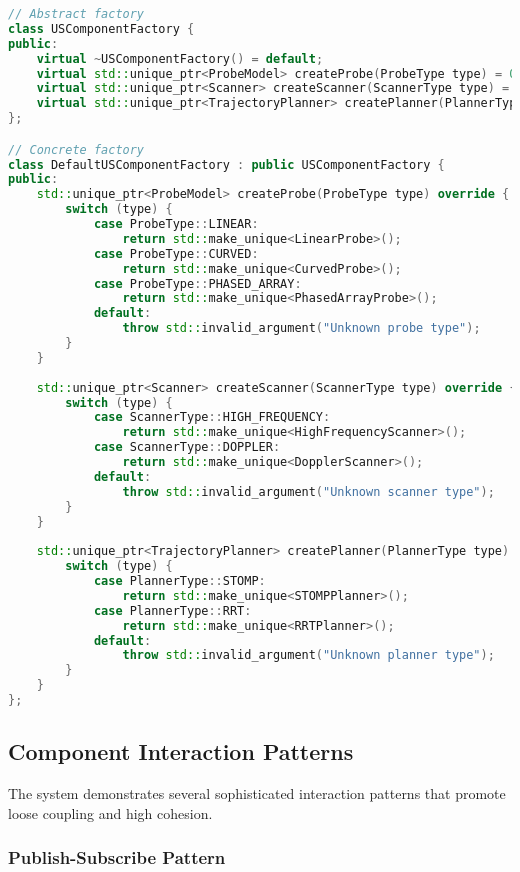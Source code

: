 \begin{lstlisting}[language=C++, caption=Factory Pattern Implementation]
// Abstract factory
class USComponentFactory {
public:
    virtual ~USComponentFactory() = default;
    virtual std::unique_ptr<ProbeModel> createProbe(ProbeType type) = 0;
    virtual std::unique_ptr<Scanner> createScanner(ScannerType type) = 0;
    virtual std::unique_ptr<TrajectoryPlanner> createPlanner(PlannerType type) = 0;
};

// Concrete factory
class DefaultUSComponentFactory : public USComponentFactory {
public:
    std::unique_ptr<ProbeModel> createProbe(ProbeType type) override {
        switch (type) {
            case ProbeType::LINEAR:
                return std::make_unique<LinearProbe>();
            case ProbeType::CURVED:
                return std::make_unique<CurvedProbe>();
            case ProbeType::PHASED_ARRAY:
                return std::make_unique<PhasedArrayProbe>();
            default:
                throw std::invalid_argument("Unknown probe type");
        }
    }
    
    std::unique_ptr<Scanner> createScanner(ScannerType type) override {
        switch (type) {
            case ScannerType::HIGH_FREQUENCY:
                return std::make_unique<HighFrequencyScanner>();
            case ScannerType::DOPPLER:
                return std::make_unique<DopplerScanner>();
            default:
                throw std::invalid_argument("Unknown scanner type");
        }
    }
    
    std::unique_ptr<TrajectoryPlanner> createPlanner(PlannerType type) override {
        switch (type) {
            case PlannerType::STOMP:
                return std::make_unique<STOMPPlanner>();
            case PlannerType::RRT:
                return std::make_unique<RRTPlanner>();
            default:
                throw std::invalid_argument("Unknown planner type");
        }
    }
};
\end{lstlisting}

\subsection{Component Interaction Patterns}
\label{subsec:interaction_patterns}

The system demonstrates several sophisticated interaction patterns that promote loose coupling and high cohesion.

\subsubsection{Publish-Subscribe Pattern}

